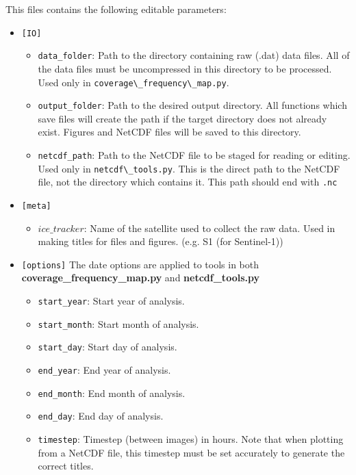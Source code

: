 \documentclass{article}
\begin{document}
            This files contains the following editable parameters:
            \begin{itemize}
                \item{} \verb?[IO]?
                \begin{itemize}
                    \item \verb?data_folder?: Path to the directory containing raw (.dat) data files. All of the data files must be uncompressed in this directory to be processed. Used only in \verb?coverage\_frequency\_map.py?.
                    \item \verb?output_folder?: Path to the desired output directory. All functions which save files will create the path if the target directory does not already exist. Figures and NetCDF files will be saved to this directory.
                    \item \verb?netcdf_path?: Path to the NetCDF file to be staged for reading or editing. Used only in \verb?netcdf\_tools.py?. This is the direct path to the NetCDF file, not the directory which contains it. This path should end with \verb?.nc?
                \end{itemize}
                \item{} \verb?[meta]?
                \begin{itemize}
                    \item $ice\_tracker$: Name of the satellite used to collect the raw data. Used in making titles for files and figures. (e.g. S1 (for Sentinel-1))
                \end{itemize}
                \item{} \verb?[options]?
                The date options are applied to tools in both \textbf{coverage\_frequency\_map.py} and \textbf{netcdf\_tools.py}
                \begin{itemize}
                    \item \verb?start_year?: Start year of analysis.
                    \item \verb?start_month?: Start month of analysis.
                    \item \verb?start_day?: Start day of analysis.
                    \item \verb?end_year?: End year of analysis.
                    \item \verb?end_month?: End month of analysis.
                    \item \verb?end_day?: End day of analysis.
                    \item \verb?timestep?: Timestep (between images) in hours. Note that when plotting from a NetCDF file, this timestep must be set accurately to generate the correct titles.

\end{itemize}
\end{itemize}
\end{document}
